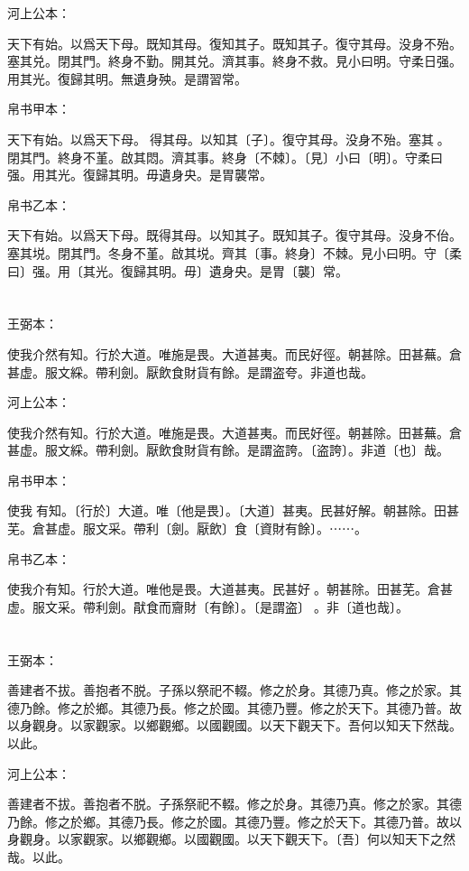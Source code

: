 \documentclass[a5paper]{ctexbook}
\begin{document}
    河上公本：

    天下有始。以爲天下母。既知其母。復知其子。既知其子。復守其母。没身不殆。塞其兑。閉其門。終身不勤。開其兑。濟其事。終身不救。見小曰明。守柔日强。用其光。復歸其明。無遺身殃。是謂習常。

    帛书甲本：

    天下有始。以爲天下母。𢟪得其母。以知其〔子〕。復守其母。没身不殆。塞其󱁂。閉其門。終身不堇。啟其悶。濟其事。終身〔不棘〕。〔見〕小曰〔明〕。守柔曰强。用其光。復歸其明。毋遺身央。是胃襲常。

    帛书乙本：

    天下有始。以爲天下母。既得其母。以知其子。既知其子。復守其母。没身不佁。塞其㙂。閉其門。冬身不堇。啟其㙂。齊其〔事。終身〕不棘。見小曰明。守〔柔曰〕强。用〔其光。復歸其明。毋〕遺身央。是胃〔襲〕常。

    \chapter{}
    王弼本：

    使我介然有知。行於大道。唯施是畏。大道甚夷。而民好徑。朝甚除。田甚蕪。倉甚虚。服文綵。帶利劍。厭飲食財貨有餘。是謂盗夸。非道也哉。

    河上公本：

    使我介然有知。行於大道。唯施是畏。大道甚夷。而民好徑。朝甚除。田甚蕪。倉甚虚。服文綵。帶利劍。厭飲食財貨有餘。是謂盗誇。〔盗誇〕。非道〔也〕哉。

    帛书甲本：

    使我𢴲有知。〔行於〕大道。唯〔他是畏〕。〔大道〕甚夷。民甚好解。朝甚除。田甚芜。倉甚虚。服文采。帶利〔劍。厭飲〕食〔資財有餘〕。⋯⋯。

    帛书乙本：

    使我介有知。行於大道。唯他是畏。大道甚夷。民甚好𠎿。朝甚除。田甚芜。倉甚虚。服文采。帶利劍。猒食而齎財〔有餘〕。〔是謂盗〕󱀖。非〔道也哉〕。

    \chapter{}
    王弼本：

    善建者不拔。善抱者不脱。子孫以祭祀不輟。修之於身。其德乃真。修之於家。其德乃餘。修之於鄉。其德乃長。修之於國。其德乃豐。修之於天下。其德乃普。故以身觀身。以家觀家。以鄉觀鄉。以國觀國。以天下觀天下。吾何以知天下然哉。以此。

    河上公本：

    善建者不拔。善抱者不脱。子孫祭祀不輟。修之於身。其德乃真。修之於家。其德乃餘。修之於鄉。其德乃長。修之於國。其德乃豐。修之於天下。其德乃普。故以身觀身。以家觀家。以鄉觀鄉。以國觀國。以天下觀天下。〔吾〕何以知天下之然哉。以此。
\end{document}
